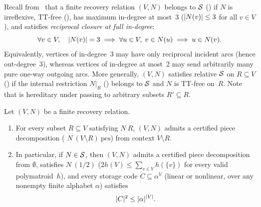 Recall from~\cite[Section~6.6]{FourthPaper2026} that a finite recovery relation $(V, N)$ belongs to $\mathcal{S}$
() if $N$ is irreflexive, TT-free (), has maximum in-degree at most~$3$
($\lvert N(v) \rvert \le 3$ for all $v \in V$), and satisfies \emph{reciprocal closure at full in-degree}:
\[
  \forall v \in V,\quad \lvert N(v) \rvert = 3 \implies \forall u \in V,\; v \in N(u) \implies u \in N(v).
\]
Equivalently, vertices of in-degree~$3$ may have only reciprocal incident arcs (hence out-degree~$3$), whereas vertices of
in-degree at most~$2$ may send arbitrarily many pure one-way outgoing arcs. More generally, $(V, N)$ satisfies relative
$\mathcal{S}$ on $R \subseteq V$ () if the internal restriction $N|_R$ () belongs to $\mathcal{S}$ and
$N$ is TT-free on~$R$. Note that  is hereditary under passing to arbitrary subsets $R' \subseteq R$.

\begin{theorem}\label{thm:Sstar}
Let $(V, N)$ be a finite recovery relation.
\begin{enumerate}
\item For every subset $R \subseteq V$ satisfying  $N\ R$, $(V, N)$ admits a certified piece decomposition
  ( $N\ (V \setminus R)\ \mathrm{pcs}$) from context $V \setminus R$.
\item In particular, if $N \in \mathcal{S}$, then $(V, N)$ admits a certified piece decomposition from $\emptyset$, satisfies
   $N\ (1/2)$ ($2 h(V) \le \sum_{v \in V} h(\{v\})$ for every valid polymatroid~$h$), and
  every storage code $C \subseteq \alpha^V$ (linear or nonlinear, over any nonempty finite alphabet $\alpha$) satisfies
  \[
    \lvert C \rvert^2 \le \lvert \alpha \rvert^{\lvert V \rvert}.
  \]
\end{enumerate}
\end{theorem}

